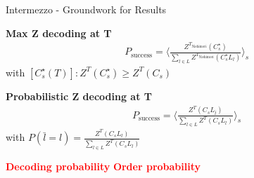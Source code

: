 \documentclass{dfki}
\begin{document}

\begin{frame}{Intermezzo - Groundwork for Results}
	\begin{minipage}{0.48\textwidth}
		\small
		\textbf{Max Z decoding at T}
		\begin{align*}
			&P_{\text{success}}=\langle\frac{Z^{T_{\text{Nishimori}}}(C^{\star}_{s})}{\sum_{l\in L}Z^{T_{\text{Nishimori}}}(C^{\star}_{s}L_{l})}\rangle_{s}
		\end{align*}
		with $[C^{\star}_{s}(T)]: Z^{T}(C^{\star}_{s})\geq Z^{T}(C_{s})$
    \end{minipage}
    \hfill
	\pause
    \begin{minipage}{0.48\textwidth}
        \small
		\textbf{Probabilistic Z decoding at T}
		\begin{align*}
			&P_{\text{success}}=\langle\frac{Z^{T}(C_{s}L_{\bar{l}})}{\sum_{l\in L}Z^{T}(C_{s}L_{l})}\rangle_{s}
		\end{align*}
		with $P(\bar{l}=l)=\frac{Z^{T}(C_{s}L_{l})}{\sum_{l\in L}Z^{T}(C_{s}L_{l})}$
    \end{minipage}
	\pause
	\textcolor{red}{\textbf{Decoding probability}}
	\hspace{3cm}
	\textcolor{red}{\textbf{Order probability}}
\end{frame}
\end{document}
